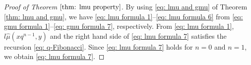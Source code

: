 \documentclass[a4paper]{article}
\newcommand{\Zz}{\mathbb{Z}}
\newcommand{\hyper}[4]{\left( \begin{matrix} #1 \\ #2 \end{matrix};#3;#4\right)}
\numberwithin{equation}{section}
\theoremstyle{plain}
\begin{document}
\begin{proof}[Proof of Theorem $\ref{thm: lmu property}$]
By using \eqref{eq: lmu and gmu} of Theorem \ref{thm: lmu and gmu}, we have \eqref{eq: lmu formula 1}--\eqref{eq: lmu formula 6} from \eqref{eq: gmu formula 1}--\eqref{eq: gmu formula 7}, respectively. 
From \eqref{eq: lmu formula 1}, $l\widehat{\mu}(x q^{n-1},y)$  and the right hand side of \eqref{eq: lmu formula 7} satisfies the recursion \eqref{eq: q-Fibonacci}. 
Since \eqref{eq: lmu formula 7} holds for $n=0$ and $n=1$, we obtain \eqref{eq: lmu formula 7}. 
%
%
%

\end{proof}
\end{document}
